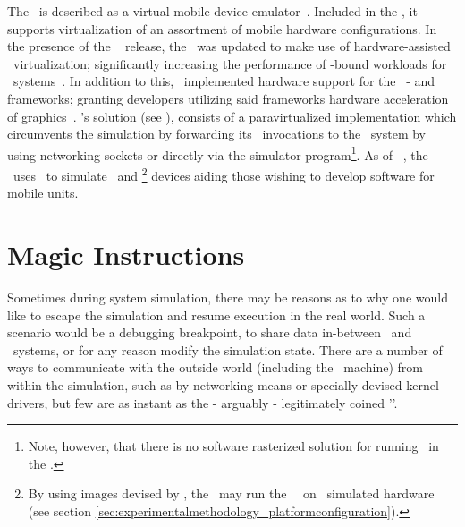 The \dvttermandroidemulator\ is described as a virtual mobile device emulator~.
Included in the \dvttermandroidsdk , it supports virtualization of an assortment of mobile hardware configurations.
In the presence of the \dvttermandroid\  release, the \dvttermandroidsdk\ was updated to make use of hardware-assisted \dvttermxeightysix\ virtualization; significantly increasing the performance of \dvttermcpu -bound workloads for \dvttermxeightysix\ systems~.
In addition to this, \dvttermgoogle\ implemented hardware support for the \dvttermopengles\ - and  frameworks; granting developers utilizing said frameworks hardware acceleration of graphics~.
\dvttermgoogle 's solution (see ), consists of a paravirtualized implementation which circumvents the simulation by forwarding its \dvttermopengles\ invocations to the \dvttermhost\ system by using networking sockets or directly via the simulator program\footnote{Note, however, that there is no software rasterized solution for running \dvttermopenglestwopointo\ in the \dvttermandroidemulator .}.
As of \dvttermandroid\ , the \dvttermandroidemulator\ uses \dvttermqemu\ to simulate \dvttermarm\ and \dvttermxeightysix \footnote{By using images devised by \dvttermintel , the \dvttermandroidemulator\ may run the \dvttermandroid\ \dvttermos\ on \dvttermxeightysix\ simulated hardware (see section \ref{sec:experimentalmethodology_platformconfiguration}).} devices aiding those wishing to develop software for mobile units.

\section{Magic Instructions}
\label{sec:backgroundandrelatedwork_magicinstructions}
Sometimes during system simulation, there may be reasons as to why one would like to escape the simulation and resume execution in the real world.
Such a scenario would be a debugging breakpoint, to share data in-between \dvttermtarget\ and \dvttermhost\ systems, or for any reason modify the simulation state.
There are a number of ways to communicate with the outside world (including the \dvttermhost\ machine) from within the simulation, such as by networking means or specially devised kernel drivers, but few are as instant as the - arguably - legitimately coined '\dvttermmagicinstruction '.

